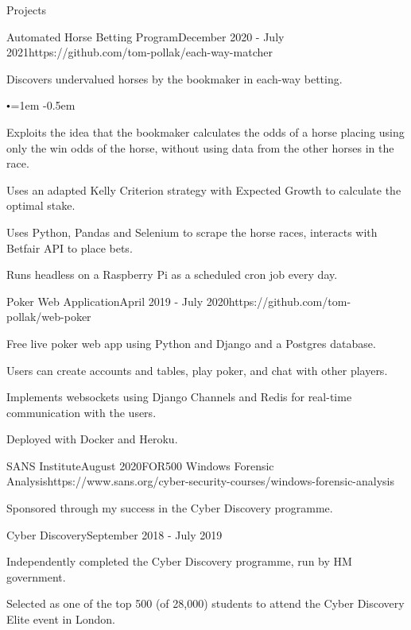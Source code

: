 \documentclass{structure}
\begin{document}
\begin{rSection}{Projects}

\begin{rSubsection}{Automated Horse Betting Program}{December 2020 - July 2021}{}{}{https://github.com/tom-pollak/each-way-matcher}
    \item Discovers undervalued horses by the bookmaker in each-way betting.
    \begin{list}{$\sbullet[0.6]$}{\leftmargin=1em} 
    \itemsep -0.5em \vspace{-0.5em} 
        \item Exploits the idea that the bookmaker calculates the odds of a horse placing using only the win odds of the horse, without using data from the other horses in the race.
    \end{list}
    \item Uses an adapted Kelly Criterion strategy with Expected Growth to calculate the optimal stake.
    \item Uses Python, Pandas and Selenium to scrape the horse races, interacts with Betfair API to place bets.
    \item Runs headless on a Raspberry Pi as a scheduled cron job every day.
\end{rSubsection}

\begin{rSubsection}{Poker Web Application}{April 2019 - July 2020}{}{}{https://github.com/tom-pollak/web-poker}
    \item Free live poker web app using Python and Django and a Postgres database.
    \item Users can create accounts and tables, play poker, and chat with other players.
    \item Implements websockets using Django Channels and Redis for real-time communication with the users.
    \item Deployed with Docker and Heroku.
\end{rSubsection}

\begin{rSubsection}{SANS Institute}{August 2020}{FOR500 Windows Forensic Analysis}{}{https://www.sans.org/cyber-security-courses/windows-forensic-analysis}
    \item Sponsored through my success in the Cyber Discovery programme.
\end{rSubsection}

\begin{rSubsection}{Cyber Discovery}{September 2018 - July 2019}{}{}{}
    \item Independently completed the Cyber Discovery programme, run by HM government.
    \item Selected as one of the top 500 (of 28,000) students to attend the Cyber Discovery Elite event in London.
\end{rSubsection}

\end{rSection}
\end{document}

